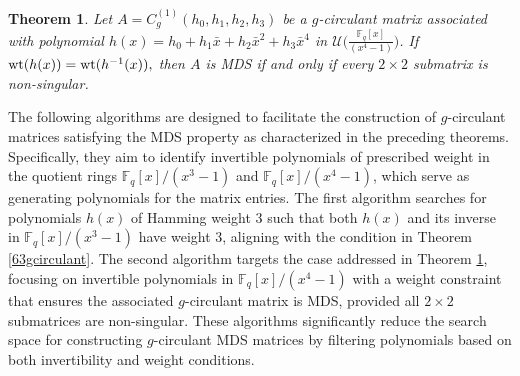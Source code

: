\documentclass[12pt]{article}
\newtheorem{theorem}{Theorem}
\begin{document}
\begin{theorem}\label{64gcirculant}
		Let $A=C^{(1)}_g(h_0,h_1,h_2,h_3)$ be a $g$-circulant matrix associated with polynomial $h(x)=h_0+h_1\bar{x}+h_2\bar{x}^2+h_3\bar{x}^4$ in $\mathcal{U}\bigg(\frac{\mathbb{F}_q[x]}{(x^4-1)}\bigg)$. If $\textup{wt}(h(x))=\textup{wt}(h^{-1}(x)),$ then $A$ is MDS if and only if every $2\times 2$ submatrix is non-singular.
\end{theorem}
The following algorithms are designed to facilitate the construction of $g$-circulant matrices satisfying the MDS property as characterized in the preceding theorems. Specifically, they aim to identify invertible polynomials of prescribed weight in the quotient rings $\mathbb{F}_q[x]/(x^3 - 1)$ and $\mathbb{F}_q[x]/(x^4 - 1)$, which serve as generating polynomials for the matrix entries. The first algorithm searches for polynomials $h(x)$ of Hamming weight $3$ such that both $h(x)$ and its inverse in $\mathbb{F}_q[x]/(x^3 - 1)$ have weight $3$, aligning with the condition in Theorem \ref{63gcirculant}. The second algorithm targets the case addressed in Theorem \ref{64gcirculant}, focusing on invertible polynomials in $\mathbb{F}_q[x]/(x^4 - 1)$ with a weight constraint that ensures the associated  $g$-circulant matrix is MDS, provided all $2 \times 2$ submatrices are non-singular. These algorithms significantly reduce the search space for constructing  $g$-circulant MDS matrices by filtering polynomials based on both invertibility and weight conditions.
\end{document}
